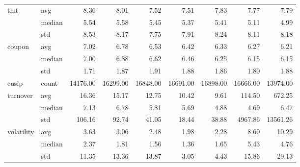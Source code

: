 \begin{tabular}{llrrrrrrr}
\cline{1-9}
\multirow[t]{3}{*}{tmt} & avg & 8.36 & 8.01 & 7.52 & 7.51 & 7.83 & 7.77 & 7.79 \\
 & median & 5.54 & 5.58 & 5.45 & 5.37 & 5.41 & 5.11 & 4.99 \\
 & std & 8.53 & 8.17 & 7.75 & 7.91 & 8.24 & 8.11 & 8.18 \\
\cline{1-9}
\multirow[t]{3}{*}{coupon} & avg & 7.02 & 6.78 & 6.53 & 6.42 & 6.33 & 6.27 & 6.21 \\
 & median & 7.00 & 6.88 & 6.62 & 6.46 & 6.25 & 6.15 & 6.15 \\
 & std & 1.71 & 1.87 & 1.91 & 1.88 & 1.86 & 1.80 & 1.88 \\
\cline{1-9}
cusip & count & 14176.00 & 16299.00 & 16848.00 & 16691.00 & 16898.00 & 16666.00 & 13974.00 \\
\cline{1-9}
\multirow[t]{3}{*}{turnover} & avg & 16.36 & 15.17 & 12.75 & 10.42 & 9.61 & 114.50 & 672.25 \\
 & median & 7.13 & 6.78 & 5.81 & 5.69 & 4.88 & 4.69 & 6.47 \\
 & std & 106.16 & 92.74 & 41.05 & 18.44 & 38.88 & 4967.86 & 13561.26 \\
\cline{1-9}
\multirow[t]{3}{*}{volatility} & avg & 3.63 & 3.06 & 2.48 & 1.98 & 2.28 & 8.60 & 10.29 \\
 & median & 2.37 & 1.81 & 1.56 & 1.36 & 1.65 & 5.43 & 4.76 \\
 & std & 11.35 & 13.36 & 13.87 & 3.05 & 4.43 & 15.86 & 29.13 \\
\cline{1-9}
\bottomrule
\end{tabular}
